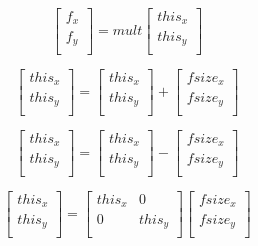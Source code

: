 \documentclass{article}
\begin{document}
\[ \left[ \begin{array}{c} f_x \\ f_y \\ \end{array} \right] = mult \left[ \begin{array}{c} this_x \\ this_y \\ \end{array} \right] \]
\pagebreak

\[ \left[ \begin{array}{c} this_x \\ this_y \\ \end{array} \right] = \left[ \begin{array}{c} this_x \\ this_y \\ \end{array} \right] + \left[ \begin{array}{c} fsize_x \\ fsize_y \\ \end{array} \right] \]
\pagebreak

\[ \left[ \begin{array}{c} this_x \\ this_y \\ \end{array} \right] = \left[ \begin{array}{c} this_x \\ this_y \\ \end{array} \right] - \left[ \begin{array}{c} fsize_x \\ fsize_y \\ \end{array} \right] \]
\pagebreak

\[ \left[ \begin{array}{c} this_x \\ this_y \\ \end{array} \right] = \left[ \begin{array}{cc} this_x & 0 \\ 0 & this_y \\ \end{array} \right] \left[ \begin{array}{c} fsize_x \\ fsize_y \\ \end{array} \right] \]
\pagebreak
\end{document}
